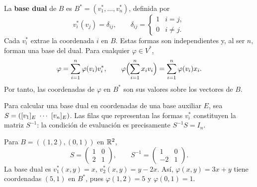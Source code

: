La \textbf{base dual} de $B$ es $B^*=(v_1^*,\ldots,v_n^*)$, definida por
\[
 v_i^*(v_j)=\delta_{ij},\qquad
 \delta_{ij}=\begin{cases}1&i=j,\\0&i\ne j.\end{cases}
\]
Cada $v_i^*$ extrae la coordenada $i$ en $B$. Estas formas son independientes
y, al ser $n$, forman una base del dual. Para cualquier $\varphi\in V^*$,
\[
 \varphi=\sum_{i=1}^n\varphi(v_i)v_i^*,\qquad
 \varphi\Bigl(\sum_{i=1}^nx_iv_i\Bigr)=\sum_{i=1}^n\varphi(v_i)x_i.
\]
Por tanto, las coordenadas de $\varphi$ en $B^*$ son sus valores sobre
los vectores de $B$.

Para calcular una base dual en coordenadas de una base auxiliar $E$,
sea $S=(\coord{v_1}{E}\ \cdots\ \coord{v_n}{E})$.
Las filas que representan las formas $v_i^*$ constituyen la matriz $S^{-1}$:
la condición de evaluación es precisamente $S^{-1}S=I_n$.

\begin{ejemplo}
Para $B=((1,2),(0,1))$ en $\mathbb{R}^2$,
\[
 S=\begin{pmatrix}1&0\\2&1\end{pmatrix},\qquad
 S^{-1}=\begin{pmatrix}1&0\\-2&1\end{pmatrix}.
\]
La base dual es $v_1^*(x,y)=x$, $v_2^*(x,y)=y-2x$.
Así, $\varphi(x,y)=3x+y$ tiene coordenadas $(5,1)$ en $B^*$,
pues $\varphi(1,2)=5$ y $\varphi(0,1)=1$.
\end{ejemplo}
